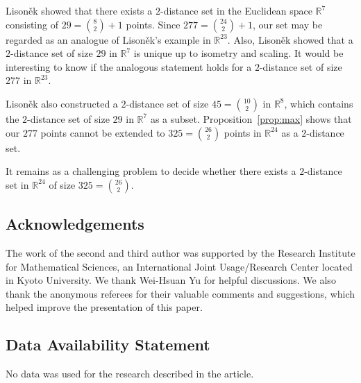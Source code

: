 \documentclass[12pt]{article}
\theoremstyle{definition}
\newcommand{\R}{\mathbb{R}}
\begin{document}
Lison\v{e}k \cite{MR1429084} showed that there exists a $2$-distance
set in the Euclidean space $\R^7$ consisting of $29=\binom{8}{2}+1$
points. Since $277=\binom{24}{2}+1$, our set may be regarded as an analogue
of Lison\v{e}k's example in $\R^{23}$.
Also, Lison\v{e}k \cite[Theorem~4.4]{MR1429084} showed that
a $2$-distance set of size $29$ in $\R^7$ is unique up to isometry and scaling.
It would be interesting to know if the analogous statement holds for
a $2$-distance set of size $277$ in $\R^{23}$.

Lison\v{e}k \cite{MR1429084} also constructed a $2$-distance set of size 
$45 = \binom{10}{2}$ in $\mathbb{R}^8$, 
which contains the $2$-distance set of size $29$ in $\mathbb{R}^7$ as a subset.
Proposition~\ref{prop:max} shows that
our $277$ points cannot be extended to 
$325=\binom{26}{2}$ points in $\mathbb{R}^{24}$ as a $2$-distance set.

It remains as a challenging problem to decide whether
there exists a $2$-distance set 
in $\R^{24}$ of size $325=\binom{26}{2}$.

\subsection*{Acknowledgements}
The work of the second and third author
was supported by the Research Institute for Mathematical Sciences, an
International Joint Usage/Research Center located in Kyoto University.
We thank Wei-Hsuan Yu for helpful discussions. We also thank the anonymous referees for their valuable comments and suggestions, which helped improve the presentation of this paper.

\subsection*{Data Availability Statement}
No data was used for the research described in the article.
\end{document}
